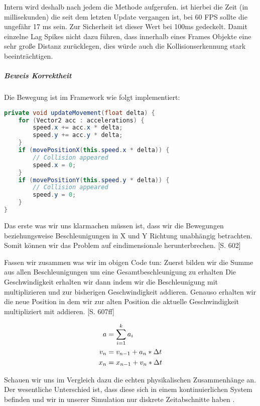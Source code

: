 Intern wird deshalb nach jedem  die Methode  aufgerufen.  ist hierbei die Zeit (in millisekunden) die seit dem letzten Update vergangen ist, bei 60 FPS sollte die ungefähr 17 ms sein. Zur Sicherheit ist dieser Wert bei 100ms gedeckelt. Damit einzelne Lag Spikes nicht dazu führen, dass innerhalb eines Frames Objekte eine sehr große Distanz zurücklegen, dies würde auch die Kollisionserkennung stark beeinträchtigen.

\subparagraph{Beweis Korrektheit}

Die Bewegung ist im Framework wie folgt implementiert:

\doinline
\begin{lstlisting}[caption=Framerate unabhängiges bewegen eines Entities, title=\hspace{0 pt}, language=java]
private void updateMovement(float delta) {
	for (Vector2 acc : accelerations) {
		speed.x += acc.x * delta;
		speed.y += acc.y * delta;
	}
	if (movePositionX(this.speed.x * delta)) {
		// Collision appeared
		speed.x = 0;
	}
	if (movePositionY(this.speed.y * delta)) {
		// Collision appeared
		speed.y = 0;
	}
}
\end{lstlisting}

Das erste was wir uns klarmachen müssen ist, dass wir die Bewegungen beziehungsweise Beschleunigungen in X und Y Richtung unabhängig betrachten. Somit können wir das Problem auf eindimensionale herunterbrechen. \cite{EMFGAIA}[S. 602]

Fassen wir zusammen was wir im obigen Code tun:
Zuerst bilden wir die Summe aus allen Beschleunigungen um eine Gesamtbeschleunigung zu erhalten
Die Geschwindigkeit erhalten wir dann indem wir die Beschleunigung mit  multiplizieren und zur bisherigen Geschwindigkeit addieren.
Genauso erhalten wir die neue Position in dem wir zur alten Position die aktuelle Geschwindigkeit multipliziert mit  addieren. \cite{EMFGAIA}[S. 607ff]

\begin{align*}
    a &= \sum_{i=1}^{k}{a_i}  \\
  v_n &= v_{n-1} + a_n * \Delta t  \\
  x_n &= x_{n-1} + v_n * \Delta t
\end{align*}

Schauen wir uns im Vergleich dazu die echten physikalischen Zusammenhänge an. Der wesentliche Unterschied ist, dass diese sich in einem kontinuierlichen System befinden und wir in unserer Simulation nur diskrete Zeitabschnitte haben .

